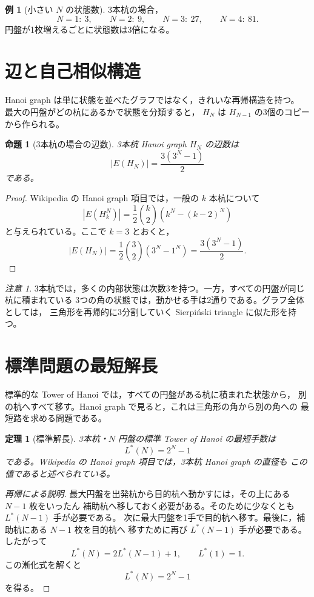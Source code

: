 \documentclass[a4paper,11pt]{ltjsarticle}
\theoremstyle{definition}
\newtheorem{example}{例}[section]
\theoremstyle{plain}
\newtheorem{proposition}{命題}[section]
\newtheorem{theorem}{定理}[section]
\theoremstyle{remark}
\newtheorem*{remark}{注意}
\newcommand{\HN}{H_N}
\begin{document}
\begin{example}[小さい \(N\) の状態数]
3本杭の場合，
\[
  N=1:\ 3,\qquad
  N=2:\ 9,\qquad
  N=3:\ 27,\qquad
  N=4:\ 81.
\]
円盤が1枚増えるごとに状態数は3倍になる。
\end{example}

\section{辺と自己相似構造}

Hanoi graph は単に状態を並べたグラフではなく，きれいな再帰構造を持つ。
最大の円盤がどの杭にあるかで状態を分類すると，
\(\HN\) は \(H_{N-1}\) の3個のコピーから作られる。

\begin{proposition}[3本杭の場合の辺数]
3本杭 Hanoi graph \(\HN\) の辺数は
\[
  |E(\HN)|=\frac{3(3^N-1)}{2}
\]
である。
\end{proposition}

\begin{proof}
Wikipedia の Hanoi graph 項目では，一般の \(k\) 本杭について
\[
  |E(H_k^N)|
  =
  \frac{1}{2}\binom{k}{2}\left(k^N-(k-2)^N\right)
\]
と与えられている。ここで \(k=3\) とおくと，
\[
  |E(\HN)|
  =
  \frac{1}{2}\binom{3}{2}(3^N-1^N)
  =
  \frac{3(3^N-1)}{2}.
\]
\end{proof}

\begin{remark}
3本杭では，多くの内部状態は次数3を持つ。一方，すべての円盤が同じ杭に積まれている
3つの角の状態では，動かせる手は2通りである。グラフ全体としては，
三角形を再帰的に3分割していく Sierpiński triangle に似た形を持つ。
\end{remark}

\section{標準問題の最短解長}

標準的な Tower of Hanoi では，すべての円盤がある杭に積まれた状態から，
別の杭へすべて移す。Hanoi graph で見ると，これは三角形の角から別の角への
最短路を求める問題である。

\begin{theorem}[標準解長]
3本杭・\(N\) 円盤の標準 Tower of Hanoi の最短手数は
\[
  L^*(N)=2^N-1
\]
である。Wikipedia の Hanoi graph 項目では，3本杭 Hanoi graph の直径も
この値であると述べられている。
\end{theorem}

\begin{proof}[再帰による説明]
最大円盤を出発杭から目的杭へ動かすには，その上にある \(N-1\) 枚をいったん
補助杭へ移しておく必要がある。そのために少なくとも \(L^*(N-1)\) 手が必要である。
次に最大円盤を1手で目的杭へ移す。最後に，補助杭にある \(N-1\) 枚を目的杭へ
移すために再び \(L^*(N-1)\) 手が必要である。したがって
\[
  L^*(N)=2L^*(N-1)+1,\qquad L^*(1)=1.
\]
この漸化式を解くと
\[
  L^*(N)=2^N-1
\]
を得る。
\end{proof}
\end{document}
